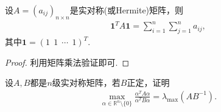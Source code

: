 \documentclass[../../main.tex]{subfiles}
\begin{document}
\begin{proposition}\label{proposition:对称阵所有元素之和就是一个二次型}
设$A=(a_{ij})_{n\times n}$是实对称(或Hermite)矩阵，则
\begin{align*}
\mathbf{1}^T A \mathbf{1} = \sum_{i=1}^n \sum_{j=1}^n a_{ij},
\end{align*}
其中$\mathbf{1}=(1\ \ 1\ \ \cdots\ \ 1)^T$.
\end{proposition}
\begin{proof}
利用矩阵乘法验证即可.

\end{proof}

\begin{proposition}\label{proposition:两个正定二次型比值的最大值}
设$A,B$都是$n$级实对称矩阵，若$B$正定，证明
\begin{align*}
\max_{\alpha\in\mathbb{R}^n\setminus\{0\}} \frac{\alpha^TA\alpha}{\alpha^TB\alpha} = \lambda_{\max}(AB^{-1}).
\end{align*}
\end{proposition}
\end{document}
